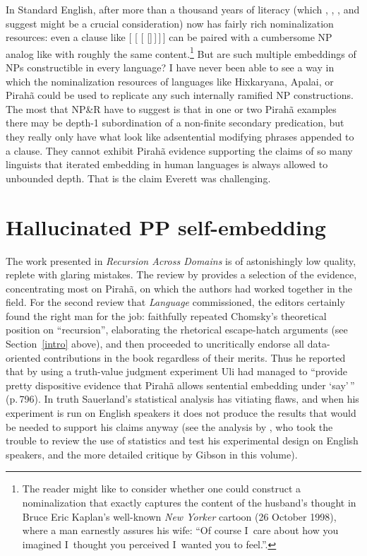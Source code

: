 \documentclass[output=paper,colorlinks,citecolor=brown
]{langscibook}
\begin{document}
In Standard English, after more than a thousand years of literacy
(which \citealt{ONeil77}, \citealt{Givon79}, \citealt{Mithun84}, and
\citealt{Kalmar85} suggest might be a crucial consideration) now has
fairly rich nominalization resources: even a clause like
 [ [
[ []\,]\,]\,] can be paired with
a cumbersome NP analog like  with roughly
the same content.\footnote{\label{cartoon}
   The reader might like to consider whether one could construct a
   nominalization that exactly captures the content of the husband's
   thought in Bruce Eric Kaplan's well-known \textit{New Yorker}
   cartoon (26 October 1998), where a man earnestly assures his wife:
   ``Of course I~care about how you imagined I~thought you perceived
   I~wanted you to feel.''.}
But are such multiple embeddings of NPs constructible in every language?
I have never been able to see a way in which the nominalization resources
of languages like Hixkaryana, Apalai, or Pirah{\~a} could be used to
replicate any such internally ramified NP constructions. The most that
NP\&R have to suggest is that in one or two Pirah{\~a} examples there
may be depth-1 subordination of a non-finite secondary predication, but
they really only have what look like adsentential modifying phrases
appended to a clause. They cannot exhibit Pirah{\~a} evidence supporting
the claims of so many linguists that iterated embedding in human
languages is always allowed to unbounded depth. That is the claim
Everett was challenging.

\section{Hallucinated PP self-embedding}\label{ppsection}

The work presented in \textit{Recursion Across Domains} \citep{AmMaNeRo18}
is of astonishingly low quality, replete with glaring mistakes. The review
by \citet{EverGibs19} provides a selection of the evidence, concentrating
most on Pirah{\~a}, on which the authors had worked together in the field.
For the second review that \textit{Language} commissioned, the editors
certainly found the right man for the job: \citet{Hornstein19} faithfully
repeated Chomsky's theoretical position on ``recursion'', elaborating
the rhetorical escape-hatch arguments (see Section~\ref{intro} above),
and then proceeded to uncritically endorse all data-oriented contributions
in the book regardless of their merits. Thus he reported that by using a
truth-value judgment experiment Uli \citet{Sauerland18} had managed to
``provide pretty dispositive evidence that Pirah{\~a} allows sentential
embedding under `say'\,'' (p.\,796). In truth Sauerland's statistical
analysis has vitiating flaws, and when his experiment is run on English
speakers it does not produce the results that would be needed to
support his claims anyway (see the analysis by
\citealt[781--784]{EverGibs19}, who took the trouble to review the use
of statistics and test his experimental design on English speakers,
and the more detailed critique by Gibson in this volume).
\end{document}
